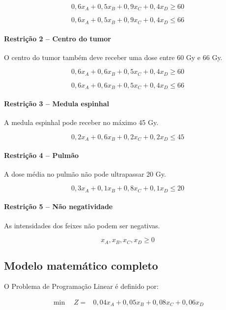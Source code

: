 \documentclass[12pt,a4paper]{article}
\begin{document}
\[
0{,}6x_A + 0{,}5x_B +
0{,}9x_C + 0{,}4x_D \geq 60
\]

\[
0{,}6x_A + 0{,}5x_B +
0{,}9x_C + 0{,}4x_D \leq 66
\]

\paragraph{Restrição 2 -- Centro do tumor}

O centro do tumor também deve receber uma dose
entre 60 Gy e 66 Gy.

\[
0{,}6x_A + 0{,}6x_B +
0{,}5x_C + 0{,}4x_D \geq 60
\]

\[
0{,}6x_A + 0{,}6x_B +
0{,}5x_C + 0{,}4x_D \leq 66
\]

\paragraph{Restrição 3 -- Medula espinhal}

A medula espinhal pode receber no máximo 45 Gy.

\[
0{,}2x_A + 0{,}6x_B +
0{,}2x_C + 0{,}2x_D \leq 45
\]

\paragraph{Restrição 4 -- Pulmão}

A dose média no pulmão não pode ultrapassar 20 Gy.

\[
0{,}3x_A + 0{,}1x_B +
0{,}8x_C + 0{,}1x_D \leq 20
\]

\paragraph{Restrição 5 -- Não negatividade}

As intensidades dos feixes não podem ser negativas.

\[
x_A, x_B, x_C, x_D \geq 0
\]

\newpage

\subsection*{Modelo matemático completo}

O Problema de Programação Linear é definido por:

\begin{equation*}
\boxed{
\begin{aligned}
\min \quad Z ={}&
0{,}04x_A + 0{,}05x_B +
0{,}08x_C + 0{,}06x_D
\end{aligned}
}
\end{equation*}
\end{document}
